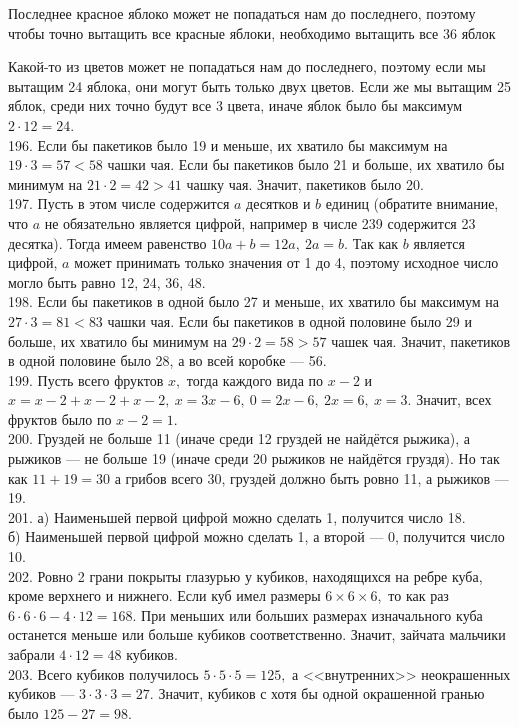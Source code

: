 \documentclass[12pt]{article}
\begin{document}
Последнее красное яблоко может не попадаться нам до последнего, поэтому чтобы точно вытащить все красные яблоки, необходимо вытащить все 36 яблок

Какой-то из цветов может не попадаться нам до последнего, поэтому если мы вытащим 24 яблока, они могут быть только двух цветов. Если же мы вытащим 25 яблок, среди них точно будут все 3 цвета, иначе яблок было бы максимум $2\cdot12=24.$\\
196. Если бы пакетиков было 19 и меньше, их хватило бы максимум на $19\cdot3=57<58$ чашки чая. Если бы пакетиков было 21 и больше, их хватило бы минимум на $21\cdot2=42>41$ чашку чая. Значит, пакетиков было 20.\\
197. Пусть в этом числе содержится $a$ десятков и $b$ единиц (обратите внимание, что $a$ не обязательно является цифрой, например в числе 239 содержится 23 десятка). Тогда имеем равенство $10a+b=12a,\ 2a=b.$ Так как $b$ является цифрой, $a$ может принимать только значения от 1 до 4, поэтому исходное число могло быть равно 12, 24, 36, 48.\\
198. Если бы пакетиков в одной было 27 и меньше, их хватило бы максимум на $27\cdot3=81<83$ чашки чая. Если бы пакетиков в одной половине было 29 и больше, их хватило бы минимум на $29\cdot2=58>57$ чашек чая. Значит, пакетиков в одной половине было 28, а во всей коробке --- 56.\\
199. Пусть всего фруктов $x,$  тогда каждого вида по $x-2$ и $x=x-2+x-2+x-2,\ x=3x-6,\ 0=2x-6,\ 2x=6,\ x=3.$ Значит, всех фруктов было по $x-2=1.$\\
200. Груздей не больше 11 (иначе среди 12 груздей не найдётся рыжика), а рыжиков --- не больше 19 (иначе среди 20 рыжиков не найдётся груздя). Но так как $11+19=30$ а грибов всего 30, груздей должно быть ровно 11, а рыжиков --- 19.\\
201. а) Наименьшей первой цифрой можно сделать 1, получится число 18.\\
б) Наименьшей первой цифрой можно сделать 1, а второй --- 0, получится число 10.\\
202. Ровно 2 грани покрыты глазурью у кубиков, находящихся на ребре куба, кроме верхнего и нижнего. Если куб имел размеры $6\times6\times6,$ то как раз $6\cdot6\cdot6-4\cdot12=168.$ При меньших или больших размерах изначального куба останется меньше или больше кубиков соответственно. Значит, зайчата мальчики забрали $4\cdot12=48$ кубиков.\\
203. Всего кубиков получилось $5\cdot5\cdot5=125,$ а <<внутренних>> неокрашенных кубиков --- $3\cdot3\cdot3=27.$ Значит, кубиков с хотя бы одной окрашенной гранью было $125-27=98.$\\
\end{document}
